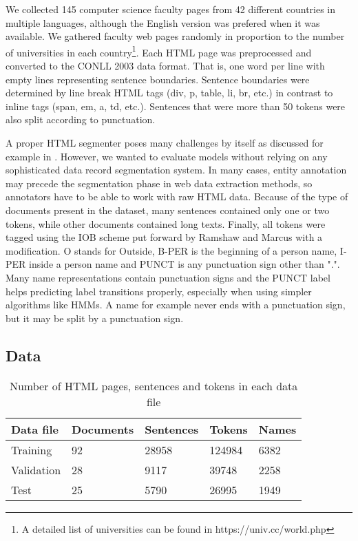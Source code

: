\documentclass[sigconf]{acmart}
\begin{document}
We collected 145 computer science faculty pages from 42 different countries in 
multiple languages, although the English version was prefered when it was available. 
We gathered faculty web pages randomly in proportion to 
the number of universities in each country\footnote{A detailed list of universities can 
be found in https://univ.cc/world.php}. Each HTML page was preprocessed and converted
to the CONLL 2003 data format. That is, one word per line with empty lines representing
sentence boundaries. Sentence boundaries were determined by line break HTML tags
(div, p, table, li, br, etc.) in contrast to inline tags (span, em, a, td, etc.). Sentences
that were more than 50 tokens were also split according to punctuation. 

A proper HTML segmenter poses many challenges by itself as discussed for example in \cite{Cai2003}.
However, we wanted to evaluate models without relying on any sophisticated data record
segmentation system. In many cases, entity annotation may precede the segmentation
phase in web data extraction methods, so annotators have to be able to work with
raw HTML data. Because of the type of documents present in the dataset, many sentences 
contained only one or two tokens, while other documents contained long texts.
Finally, all tokens were tagged using the IOB scheme put forward by
Ramshaw and Marcus \cite{Ramshaw1995} with a modification. O stands for Outside, 
B-PER is the beginning of a person name, I-PER inside a person name and PUNCT is any 
punctuation sign other than ".". Many name representations contain punctuation signs 
and the PUNCT label helps predicting label transitions properly, especially when using 
simpler algorithms like HMMs. A name for example never ends with a punctuation sign,
but it may be split by a punctuation sign.

\subsection{Data}

\begin{table}[h]
  \small
  \begin{center}
    \begin{tabular}{ |l|l|l|l|l| }
      \hline
      Data file & Documents & Sentences & Tokens & Names \\
      \hline
      Training    & 92 & 28958 & 124984 & 6382 \\
      Validation  & 28 & 9117  & 39748  & 2258 \\
      Test        & 25 & 5790  & 26995  & 1949 \\
      \hline
    \end{tabular}
  \end{center}
  \caption{Number of HTML pages, sentences and tokens in each data file}
  \label{tab:dataset}
\end{table}
\end{document}
